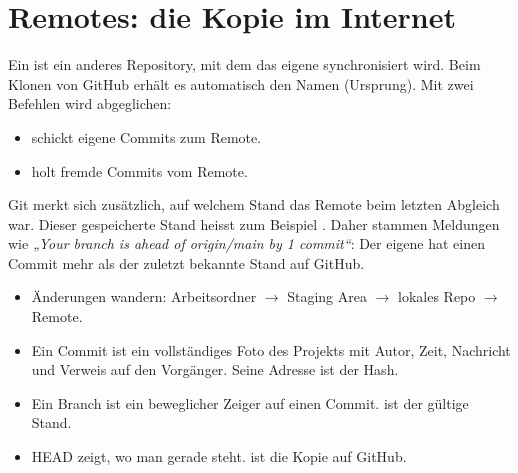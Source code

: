 \section{Remotes: die Kopie im Internet}

Ein  ist ein anderes Repository, mit dem das eigene synchronisiert wird.
Beim Klonen von GitHub erhält es automatisch den Namen  (Ursprung). Mit zwei
Befehlen wird abgeglichen:

\begin{itemize}
  \item {} schickt eigene Commits zum Remote.
  \item {} holt fremde Commits vom Remote.
\end{itemize}

Git merkt sich zusätzlich, auf welchem Stand das Remote beim letzten Abgleich war. Dieser
gespeicherte Stand heisst zum Beispiel . Daher stammen Meldungen wie
\emph{„Your branch is ahead of \textquotesingle{}origin/main\textquotesingle{} by 1 commit“}:
Der eigene  hat einen Commit mehr als der zuletzt bekannte Stand auf GitHub.

\begin{zusammenfassung}
\begin{itemize}[nosep]
  \item Änderungen wandern: Arbeitsordner $\rightarrow$ Staging Area $\rightarrow$
        lokales Repo $\rightarrow$ Remote.
  \item Ein Commit ist ein vollständiges Foto des Projekts mit Autor, Zeit, Nachricht und
        Verweis auf den Vorgänger. Seine Adresse ist der Hash.
  \item Ein Branch ist ein beweglicher Zeiger auf einen Commit.  ist der gültige Stand.
  \item HEAD zeigt, wo man gerade steht.  ist die Kopie auf GitHub.
\end{itemize}
\end{zusammenfassung}
